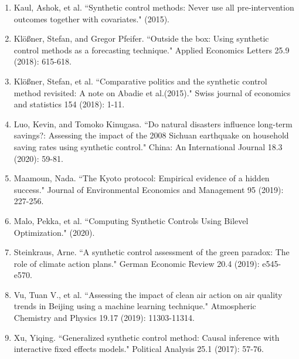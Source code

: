 \documentclass[12pt,a4paper,draft]{article}
\begin{document}
\begin{enumerate}
    \item Kaul, Ashok, et al. ``Synthetic control methods: Never use all pre-intervention outcomes together with covariates." (2015).
    \item Klößner, Stefan, and Gregor Pfeifer. ``Outside the box: Using synthetic control methods as a forecasting technique." Applied Economics Letters 25.9 (2018): 615-618.
    \item Klößner, Stefan, et al. ``Comparative politics and the synthetic control method revisited: A note on Abadie et al.(2015)." Swiss journal of economics and statistics 154 (2018): 1-11.
    \item Luo, Kevin, and Tomoko Kinugasa. ``Do natural disasters influence long-term savings?: Assessing the impact of the 2008 Sichuan earthquake on household saving rates using synthetic control." China: An International Journal 18.3 (2020): 59-81.
    \item Maamoun, Nada. ``The Kyoto protocol: Empirical evidence of a hidden success." Journal of Environmental Economics and Management 95 (2019): 227-256.
    \item Malo, Pekka, et al. ``Computing Synthetic Controls Using Bilevel Optimization." (2020).
    \item Steinkraus, Arne. ``A synthetic control assessment of the green paradox: The role of climate action plans." German Economic Review 20.4 (2019): e545-e570.
    \item Vu, Tuan V., et al. ``Assessing the impact of clean air action on air quality trends in Beijing using a machine learning technique." Atmospheric Chemistry and Physics 19.17 (2019): 11303-11314.
    \item Xu, Yiqing. ``Generalized synthetic control method: Causal inference with interactive fixed effects models." Political Analysis 25.1 (2017): 57-76.
\end{enumerate}
\end{document}
